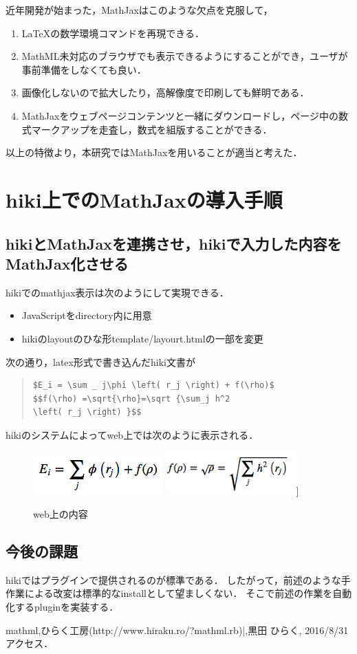 \documentclass[10pt,a4j,twocolumn]{jsarticle}
\begin{document}
近年開発が始まった，MathJaxはこのような欠点を克服して，
\begin{enumerate}
\item LaTeXの数学環境コマンドを再現できる．
\item MathML未対応のブラウザでも表示できるようにすることができ，ユーザが事前準備をしなくても良い．
\item 画像化しないので拡大したり，高解像度で印刷しても鮮明である．
\item MathJaxをウェブページコンテンツと一緒にダウンロードし，ページ中の数式マークアップを走査し，数式を組版することができる．
\end{enumerate}
以上の特徴より，本研究ではMathJaxを用いることが適当と考えた．

\section{hiki上でのMathJaxの導入手順}
\subsection{hikiとMathJaxを連携させ，hikiで入力した内容をMathJax化させる}
hikiでのmathjax表示は次のようにして実現できる．
\begin{itemize}
\item JavaScriptをdirectory内に用意
\item hikiのlayoutのひな形template/layourt.htmlの一部を変更
\end{itemize}
次の通り，latex形式で書き込んだhiki文書が
\begin{quote}\begin{verbatim}
$E_i = \sum _ j\phi \left( r_j \right) + f(\rho)$
$$f(\rho) =\sqrt{\rho}=\sqrt {\sum_j h^2 
\left( r_j \right) }$$
\end{verbatim}\end{quote}
hikiのシステムによってweb上では次のように表示される．


\begin{figure}[h]
  \centering
  \includegraphics[width=5cm]{Math_test1.png}
  \includegraphics[width=5cm]{Math_test2.png}]
  \caption{web上の内容}
\end{figure}

\subsection{今後の課題}
hikiではプラグインで提供されるのが標準である．
したがって，前述のような手作業による改変は標準的なinstallとして望ましくない．
そこで前述の作業を自動化するpluginを実装する．

\begin{thebibliography}{9}
mathml,ひらく工房(http://www.hiraku.ro/?mathml.rb)|,黒田 ひらく, 2016/8/31アクセス．
\end{thebibliography}
\end{document}
